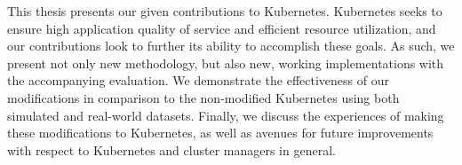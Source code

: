 This thesis presents our given contributions to Kubernetes. Kubernetes seeks to
ensure high application quality of service and efficient resource utilization,
and our contributions look to further its ability to accomplish these
goals. As such, we present not only new methodology, but also new, working
implementations with the accompanying evaluation. We demonstrate the effectiveness
of our modifications in comparison to the non-modified Kubernetes using both
simulated and real-world datasets. Finally, we
discuss the experiences of making these modifications to Kubernetes, as well as
avenues for future improvements with respect to Kubernetes and cluster managers in
general.

